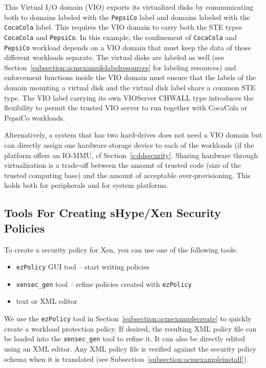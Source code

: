 \documentclass[11pt,twoside,final,openright]{report}
\begin{document}
This Virtual I/O domain (VIO) exports its virtualized disks by
communicating both to domains labeled with the \verb|PepsiCo| label
and domains labeled with the \verb|CocaCola| label. This requires the
VIO domain to carry both the STE types \verb|CocaCola| and
\verb|PepsiCo|. In this example, the confinement of \verb|CocaCola|
and \verb|PepsiCo| workload depends on a VIO domain that must keep the
data of those different workloads separate. The virtual disks are
labeled as well (see Section~\ref{subsection:acmexamplelabelresources}
for labeling resources) and enforcement functions inside the VIO
domain must ensure that the labels of the domain mounting a virtual
disk and the virtual disk label share a common STE type. The VIO label
carrying its own VIOServer CHWALL type introduces the flexibility to
permit the trusted VIO server to run together with CocaCola or PepsiCo
workloads.

Alternatively, a system that has two hard-drives does not need a VIO
domain but can directly assign one hardware storage device to each of
the workloads (if the platform offers an IO-MMU, cf
Section~\ref{s:ddsecurity}.  Sharing hardware through virtualization
is a trade-off between the amount of trusted code (size of the trusted
computing base) and the amount of acceptable over-provisioning. This
holds both for peripherals and for system platforms.

\subsection{Tools For Creating sHype/Xen Security Policies}
To create a security policy for Xen, you can use one of the following
tools:
\begin{itemize}
\item \verb|ezPolicy| GUI tool -- start writing policies
\item \verb|xensec_gen| tool -- refine policies created with \verb|ezPolicy|
\item text or XML editor
\end{itemize}

We use the \verb|ezPolicy| tool in
Section~\ref{subsection:acmexamplecreate} to quickly create a workload
protection policy. If desired, the resulting XML policy file can be
loaded into the \verb|xensec_gen| tool to refine it. It can also be
directly edited using an XML editor. Any XML policy file is verified
against the security policy schema when it is translated (see
Subsection~\ref{subsection:acmexampleinstall}).
\end{document}
